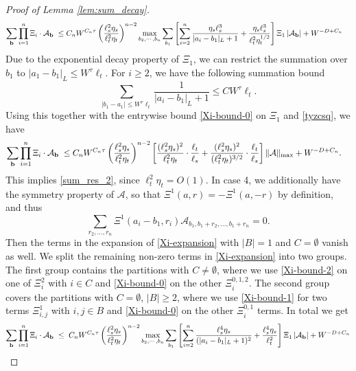 \begin{proof}[Proof of Lemma \ref{lem:sum_decay}]
\begin{align}\label{llswuwg2}
  \sum_{\textbf{b}}   \prod_{i=1}^n  \Xi_i  \cdot 
{\cal A}_{\textbf{b}}
\;\le\; & C_n W^{C_n\tau} \left(\frac{\ell_s^{2} \eta_s}{\ell_t^{2} \eta_t}\right)^{n-2}  \max_{b_2,\cdots, b_n}  \sum_{b_1 }\left[\sum_{i=2}^n \frac{\eta_s\ell_s^3}{|a_i-b_1|_L+1}+\frac{\eta_s\ell_s^3}{\ell_t^2\eta_t^{1/2}}\right]\Xi_1\left| {\cal A}_{\textbf{b}}\right|+W^{-D+C_n}
\end{align}
Due to the exponential decay property of $\Xi_1$, we can restrict the summation over $b_1$ to $|a_1-b_1|_L\le W^\tau\ell_t$. For $i\ge 2$, we have the following summation bound
\begin{equation}\label{eq-1sum}
    \sum_{|b_1-a_1|\le W^\tau\ell_t} \frac{1}{|a_i-b_1|_L+1} \le CW^\tau \ell_t.
\end{equation}
Using this together with the entrywise bound \eqref{Xi-bound-0} on $\Xi_1$ and \eqref{tyzcsq}, we have 
\begin{align}\label{llswuwg3}
  \sum_{\textbf{b}}   \prod_{i=1}^n  \Xi_i  \cdot 
{\cal A}_{\textbf{b}}
\;\le\; & C_n W^{C_n\tau} \left(\frac{\ell_s^{2} \eta_s}{\ell_t^{2} \eta_t}\right)^{n-2}  \left[\frac{(\ell_s^2\eta_s)^2}{\ell_t^2\eta_t}\cdot\frac{\ell_t}{\ell_s}+\frac{(\ell_s^2\eta_s)^2}{(\ell_t^2\eta_t)^{3/2}}\cdot\frac{\ell_t}{\ell_s}\right]\| {\cal A}\|_{\max}+W^{-D+C_n}.
\end{align}
This implies \eqref{sum_res_2}, since $\ell_t^2\eta_t=O(1)$. In case 4, we additionally have the symmetry property of $\mathcal{A}$, so that $\Xi^1(a, r) = -\Xi^1(a, -r)$ by definition, and thus
$$
\sum_{r_2,\ldots,r_n} \Xi^1(a_i-b_1, r_i) \mathcal{A}_{b_1, b_1+r_2,\ldots,b_1+r_n} = 0.
$$
Then the terms in the expansion of \eqref{Xi-expansion} with $|B| = 1$ and $C= \emptyset$ vanish as well. We split the remaining non-zero terms in \eqref{Xi-expansion} into two groups. The first group contains the partitions with $C \neq \emptyset$, where we use \eqref{Xi-bound-2} on one of $\Xi_i^2$ with $i\in C$ and \eqref{Xi-bound-0} on the other $\Xi^{0,1,2}_i$. The second group covers the partitions with $C = \emptyset$, $|B|\ge 2$, where we use \eqref{Xi-bound-1} for two terms $\Xi^1_{i,j}$ with $i, j\in B$ and \eqref{Xi-bound-0} on the other $\Xi^{0,1}_i$ terms. In total we get
\begin{align}
\sum_{\textbf{b}}   \prod_{i=1}^n  \Xi_i  \cdot 
{\cal A}_{\textbf{b}}
\;&\le\; C_n W^{C_n\tau} \left(\frac{\ell_s^{2} \eta_s}{\ell_t^{2} \eta_t}\right)^{n-2} \max_{b_2,\cdots, b_n}  \sum_{b_1}\left[\sum_{i=2}^n\frac{\ell_s^4\eta_s}{(|a_i-b_1|_L+1)^2}+ \frac{\ell_s^4\eta_s}{\ell_t^2}\right] \Xi_1 \left|{\cal A}_{\textbf{b}}\right|+W^{-D+C_n}\nonumber\\

\end{align}
\end{proof}
